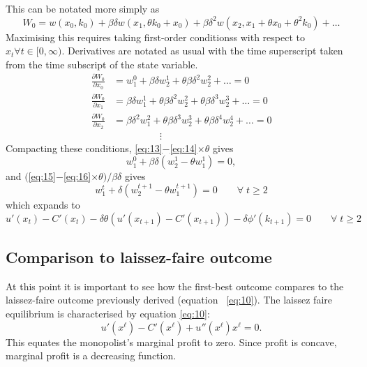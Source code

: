 \documentclass{amsart}
\newcommand{\del}[2]{\frac{\partial #1}{\partial #2}}
\begin{document}
This can be notated more simply as
\begin{equation}
  \label{eq:12} W_0 = w(x_0,k_0) + \beta\delta w(x_1,\theta k_0+x_0) +
\beta\delta^2 w(x_2,x_1+\theta x_0+\theta^2 k_0) + \ldots
\end{equation} Maximising this requires taking first-order conditionss
with respect to $x_t \forall t\in [0,\infty)$. Derivatives are notated
as usual with the time superscript taken from the time subscript of
the state variable.
\begin{align}
  \label{eq:13} \del{W_0}{x_0} &= w_1^0 + \beta\delta w_2^1 +
\theta\beta\delta^2 w_2^2 + \ldots = 0 \\ \label{eq:14} \del{W_0}{x_1}
&=\beta\delta w_1^1 + \theta\beta\delta^2 w_2^2 + \theta\beta\delta^3
w_2^3 + \ldots = 0 \\ \label{eq:15} \del{W_0}{x_2} &=\beta\delta^2
w_1^2 + \theta\beta\delta^3 w_2^3 + \theta\beta\delta^4 w_2^4 + \ldots
= 0 \\ &\hspace{2cm}\vdots
\end{align} Compacting these conditions,
\eqref{eq:13}$-$\eqref{eq:14}$\times\theta$ gives
\begin{equation}
  \label{eq:16} w^0_1 + \beta\delta \left(w^1_2 - \theta w^1_1 \right)
= 0,
\end{equation} and $($\eqref{eq:15}$-$\eqref{eq:16}$\times\theta ) /
\beta\delta$ gives
\begin{equation}
  \label{eq:17} w^t_1 + \delta \left(w^{t+1}_2 - \theta w^{t+1}_1 \right)
= 0 \qquad \forall\; t \geq 2
\end{equation}
which expands to
\begin{equation}
  \label{eq:18}
  u'(x_t) - C'(x_t) - \delta\theta \left( u'(x_{t+1}) -
    C'(x_{t+1})\right) - \delta\phi'(k_{t+1}) = 0 \qquad \forall\; t
  \geq 2
\end{equation}

\subsection{Comparison to laissez-faire outcome}
\label{sec:comp-laiss-faire}

At this point it is important to see how the first-best outcome
compares to the laissez-faire outcome previously derived
(equation ~\eqref{eq:10}). The laissez faire equilibrium is
characterised by equation \eqref{eq:10}:
\begin{equation}
  \label{eq:19}
  u'\left( x^{\ell}\right) - C'\left( x^{\ell}\right) + u''\left(
    x^{\ell}\right) x^{\ell} = 0.
\end{equation}
This equates the monopolist's marginal profit to zero. Since profit is
concave, marginal profit is a decreasing function.
\end{document}
